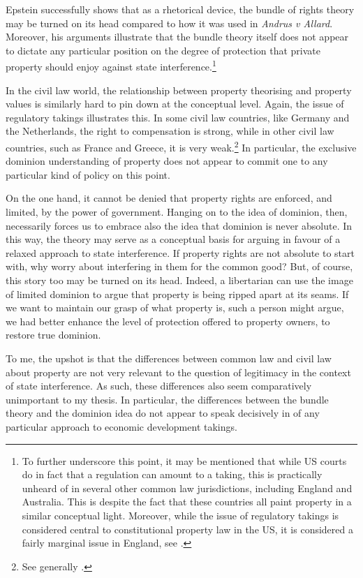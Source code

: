 Epstein successfully shows that as a rhetorical device, the bundle of rights theory may be turned on its head compared to how it was used in {\it Andrus v Allard}. Moreover, his arguments illustrate that the bundle theory itself does not appear to dictate any particular position on the degree of protection that private property should enjoy against state interference.\footnote{To further underscore this point, it may be mentioned that while US courts do in fact  that a regulation can amount to a taking, this is practically unheard of in several other common law jurisdictions, including England and Australia. This is despite the fact that these countries all paint property in a similar conceptual light. Moreover, while the issue of regulatory takings is considered central to constitutional property law in the US, it is considered a fairly marginal issue in England, see \cite{purdue10}.}

In the civil law world, the relationship between property theorising and property values is similarly hard to pin down at the conceptual level. Again, the issue of regulatory takings illustrates this. In some civil law countries, like Germany and the Netherlands, the right to compensation is strong, while in other civil law countries, such as France and Greece, it is very weak.\footnote{See generally \cite{alterman10}.} In particular, the exclusive dominion understanding of property does not appear to commit one to any particular kind of policy on this point. 

On the one hand, it cannot be denied that property rights are enforced, and limited, by the power of government. Hanging on to the idea of dominion, then, necessarily forces us to embrace also the idea that dominion is never absolute. In this way, the theory may serve as a conceptual basis for arguing in favour of a relaxed approach to state interference. If property rights are not absolute to start with, why worry about interfering in them for the common good? But, of course, this story too may be turned on its head. Indeed, a libertarian can use the image of limited dominion to argue that property is being ripped apart at its seams. If we want to maintain our grasp of what property is, such a person might argue, we had better enhance the level of protection offered to property owners, to restore true dominion.

To me, the upshot is that the differences between common law and civil law  about property are not very relevant to the question of legitimacy in the context of state interference. As such, these differences also seem comparatively unimportant to my thesis. In particular, the differences between the bundle theory and the dominion idea do not appear to speak decisively in  of any particular approach to economic development takings.

